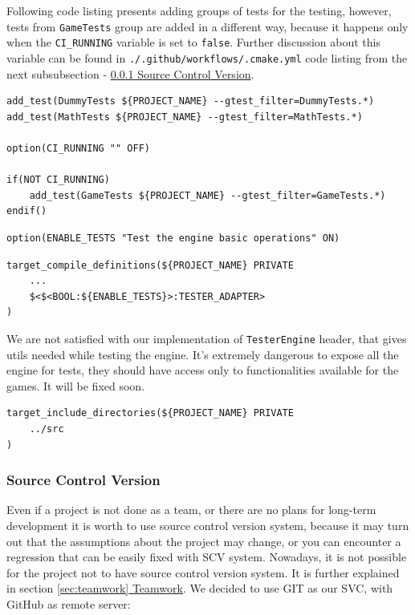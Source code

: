 Following code listing presents adding groups of tests for the testing, however, tests from \texttt{GameTests} group are added in a different way, because it happens only when the  \texttt{CI\_RUNNING} variable is set to \texttt{false}.
Further discussion about this variable can be found in \texttt{./.github/workflows/.cmake.yml} code listing from the next subsubsection - \hyperref[sec:scv]{\ref*{sec:scv} Source Control Version}.
\begin{lstlisting}[caption=Adding tests to CTest (./engine/CMakeLists.txt)]
add_test(DummyTests ${PROJECT_NAME} --gtest_filter=DummyTests.*)
add_test(MathTests ${PROJECT_NAME} --gtest_filter=MathTests.*)

option(CI_RUNNING "" OFF)

if(NOT CI_RUNNING)
    add_test(GameTests ${PROJECT_NAME} --gtest_filter=GameTests.*)
endif()
\end{lstlisting}

\begin{lstlisting}[caption=Enabling Tests(./CMakeLists.txt)]
option(ENABLE_TESTS "Test the engine basic operations" ON)
\end{lstlisting}

\begin{lstlisting}[caption=\texttt{TESTER\_ADAPTER} preprocessor declaration(./engine/CMakeLists.txt and ./engine/tests/CMakeLists.txt)]
target_compile_definitions(${PROJECT_NAME} PRIVATE
    ...
    $<$<BOOL:${ENABLE_TESTS}>:TESTER_ADAPTER>
)
\end{lstlisting}

We are not satisfied with our implementation of \texttt{TesterEngine} header, that gives utils needed while testing the engine. It's extremely dangerous to expose all the engine for tests, they should have access only to functionalities available for the games. It will be fixed soon. 
\begin{lstlisting}[caption=Including common internal utils (./engine/tests/CMakeLists.txt)]
target_include_directories(${PROJECT_NAME} PRIVATE
    ../src
)
\end{lstlisting}

\subsubsection{Source Control Version}
\label{sec:scv}
\hspace{\parindent}
Even if a project is not done as a team, or there are no plans for long-term development it is worth to use source control version system, because it may turn out that the assumptions about the project may change, or you can encounter a regression that can be easily fixed with SCV system.  Nowadays, it is not possible for the project not to have source control version system. It is further explained in section \hyperref[sec:teamwork]{\ref*{sec:teamwork} Teamwork}.
We decided to use GIT as our SVC, with GitHub as remote server:


